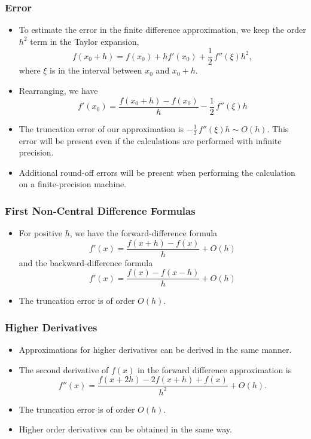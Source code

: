 \documentclass{beamer}
\begin{document}
\begin{frame}[fragile]
\frametitle{Error}
\begin{itemize}
\item To estimate the error in the finite difference approximation, we keep the order $h^2$ term in the Taylor expansion, 
\[
f(x_0+h)=f(x_0)+h f'(x_0)+\frac{1}{2}\,f''(\xi)h^2, 
\]
where $\xi$ is in the interval between $x_0$ and $x_0+h$.  
\item Rearranging, we have 
\[
f'(x_0)= \frac{f(x_0+h)-f(x_0)}{h}-\frac{1}{2}\,f''(\xi)h
\]
\item The \alert{truncation error} of our approximation is  $-\frac{1}{2}\,f''(\xi)h\sim O(h)$. This error will be present even if the calculations are performed with infinite precision. 
\item Additional  \alert{round-off errors} will be present when performing the calculation on a finite-precision machine.  
\end{itemize}
\end{frame}
\begin{frame}[fragile]
\frametitle{First Non-Central Difference Formulas}
%
\begin{itemize}
\item For positive $h$, we have the \alert{forward-difference formula}
\[
f'(x)=\frac{f(x+h)-f(x)}{h}+O(h)
\] 
and the \alert{backward-difference formula}
\[
f'(x)=\frac{f(x)-f(x-h)}{h}+O(h)
\]
\item The truncation error is of order $O(h)$. 
\end{itemize}
\end{frame}
\begin{frame}[fragile]
\frametitle{Higher Derivatives }
\begin{itemize}
\item  Approximations for higher derivatives can be derived in the same manner. 
\item The second derivative of $f(x)$ in the forward difference approximation is 
\[
f''(x)=\frac{f(x+2h)-2f(x+h)+f(x)}{h^2}+O(h).
\]
\item The truncation error is  of order $O(h)$. 
\item Higher order derivatives can be obtained in the same way.
\end{itemize}
\end{frame}
\end{document}
